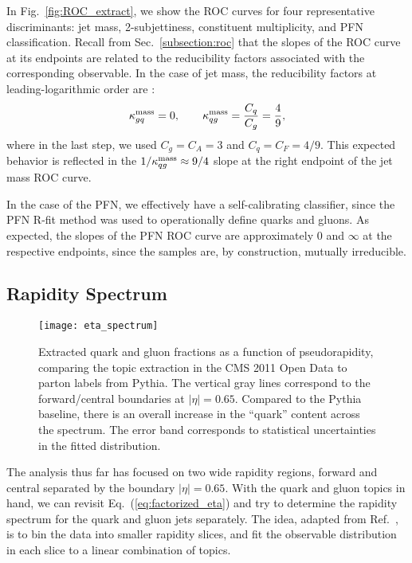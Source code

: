\documentclass[aps,prd,twocolumn,preprintnumbers,nofootinbib,longbibliography,floatfix]{revtex4-1}
\DeclareRobustCommand{\Sec}[1]{Sec.~\ref{#1}}
\DeclareRobustCommand{\Fig}[1]{Fig.~\ref{#1}}
\DeclareRobustCommand{\Eq}[1]{Eq.~(\ref{#1})}
\DeclareRobustCommand{\Ref}[1]{Ref.~\cite{#1}}
\newcommand{\Pythia}{{\sc Pythia}\xspace}
\begin{document}
In \Fig{fig:ROC_extract}, we show the ROC curves for four representative discriminants: jet mass, 2-subjettiness, constituent multiplicity, and PFN classification.
%
Recall from \Sec{subsection:roc} that the slopes of the ROC curve at its endpoints are related to the reducibility factors associated with the corresponding observable.
%
In the case of jet mass, the reducibility factors at leading-logarithmic order are \cite{Metodiev:2018ftz}:
%
\begin{equation}
\label{eq:jetmassprediction}
\kappa^{\rm mass}_{gq} = 0, \qquad  \kappa^{\rm mass}_{qg} = \frac{C_q}{C_g} = \frac{4}{9},
\end{equation}
%
where in the last step, we used $C_g = C_A = 3$ and $C_q = C_F = 4/9$.
%
This expected behavior is reflected in the $1/\kappa^{\rm mass}_{qg} \approx 9/4$ slope at the right endpoint of the jet mass ROC curve.


In the case of the PFN, we effectively have a self-calibrating classifier, since the PFN R-fit method was used to operationally define quarks and gluons.
%
As expected, the slopes of the PFN ROC curve are approximately $0$ and $\infty$ at the respective endpoints, since the samples are, by construction, mutually irreducible.


\subsection{Rapidity Spectrum}
\label{eq:rapidity_spectrum}

\begin{figure}[t]
	\texttt{[image: eta\_spectrum]}
	\caption{
		Extracted quark and gluon fractions as a function of pseudorapidity, comparing the topic extraction in the CMS 2011 Open Data to parton labels from \Pythia.
		The vertical gray lines correspond to the forward/central boundaries at $|\eta| = 0.65$.
		Compared to the \Pythia baseline, there is an overall increase in the ``quark'' content across the spectrum.
		The error band corresponds to statistical uncertainties in the fitted distribution.
	}
	\label{fig:rapidity_spectrum}
\end{figure}



The analysis thus far has focused on two wide rapidity regions, forward and central separated by the boundary $|\eta| = 0.65$.
%
With the quark and gluon topics in hand, we can revisit \Eq{eq:factorized_eta} and try to determine the rapidity spectrum for the quark and gluon jets separately.
%
The idea, adapted from \Ref{Metodiev:2018ftz}, is to bin the data into smaller rapidity slices, and fit the observable distribution in each slice to a linear combination of topics.
\end{document}
